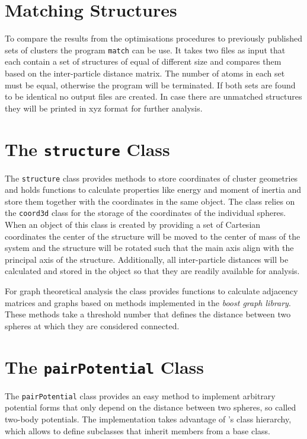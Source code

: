 \section{Matching Structures}
\label{sec:matchingstructures}

To compare the results from the optimisations procedures to previously
published sets of clusters the program \verb|match| can be use. It takes two
files as input that each contain a set of structures of equal of different size
and compares them based on the inter-particle distance matrix. The number of
atoms in each set must be equal, otherwise the program will be terminated. If
both sets are found to be identical no output files are created. In case there
are unmatched structures they will be printed in xyz format for further
analysis.
\section{The \texttt{structure} Class}
\label{sec:thestructureclass}

The \verb|structure| class provides methods to store coordinates of cluster
geometries and holds functions to calculate properties like energy and moment
of inertia and store them together with the coordinates in the same object. The
class relies on the \verb|coord3d| class for the storage of the coordinates of
the individual spheres.  When an object of this class is created by providing a
set of Cartesian coordinates the center of the structure will be moved to the
center of mass of the system and the structure will be rotated such that the
main axis align with the principal axis of the structure. Additionally, all
inter-particle distances will be calculated and stored in the object so that
they are readily available for analysis.

For graph theoretical analysis the class provides functions to calculate
adjacency matrices and graphs based on methods implemented in the \textit{boost
graph library}\autocite{_boost_2002}. These methods take a threshold number
that defines the distance between two spheres at which they are considered
connected.

\section{The \texttt{pairPotential} Class}
\label{sec:thepairpotentialclass}

The \texttt{pairPotential} class provides an easy method to implement arbitrary
potential forms that only depend on the distance between two spheres, so called
two-body potentials. The implementation takes advantage of \Cpp's class
hierarchy, which allows to define subclasses that inherit members from a base
class.



